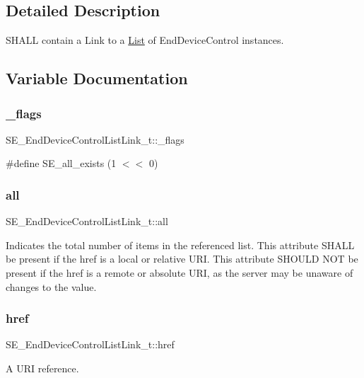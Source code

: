 \subsection{Detailed Description}
S\+H\+A\+LL contain a Link to a \hyperlink{structList}{List} of End\+Device\+Control instances. 

\subsection{Variable Documentation}
\mbox{\label{group__EndDeviceControlListLink_gac8b545f4be968f1fc37a72590fc41aee}} 
\subsubsection{\texorpdfstring{\+\_\+flags}{\_flags}}
{\footnotesize\ttfamily S\+E\+\_\+\+End\+Device\+Control\+List\+Link\+\_\+t\+::\+\_\+flags}

\#define S\+E\+\_\+all\+\_\+exists (1 $<$$<$ 0) \mbox{\label{group__EndDeviceControlListLink_ga656a30b9a25ba0e7c4a900517700b30b}} 
\subsubsection{\texorpdfstring{all}{all}}
{\footnotesize\ttfamily S\+E\+\_\+\+End\+Device\+Control\+List\+Link\+\_\+t\+::all}

Indicates the total number of items in the referenced list. This attribute S\+H\+A\+LL be present if the href is a local or relative U\+RI. This attribute S\+H\+O\+U\+LD N\+OT be present if the href is a remote or absolute U\+RI, as the server may be unaware of changes to the value. \mbox{\label{group__EndDeviceControlListLink_gad0d8d1cc17c6e6bc8ccc865b312ace64}} 
\subsubsection{\texorpdfstring{href}{href}}
{\footnotesize\ttfamily S\+E\+\_\+\+End\+Device\+Control\+List\+Link\+\_\+t\+::href}

A U\+RI reference. 